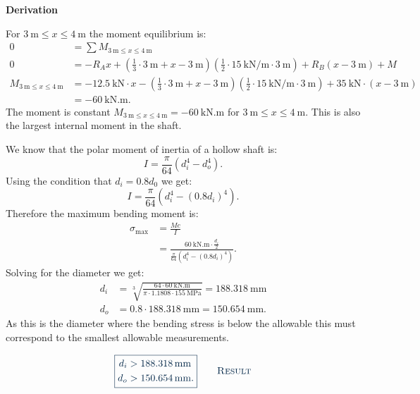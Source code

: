 \documentclass[a4paper]{article}
\numberwithin{equation}{problem}
\newcommand{\AUheading}[1]{%
  \par\vspace{.4\baselineskip}%
  {\sffamily\bfseries\color{AUblueDark}#1\par}%
  \nobreak%
}
\newenvironment{derivation}[1][Derivation]{%
  \AUheading{#1}
  \begingroup\allowdisplaybreaks
  \setlength{\abovedisplayskip}{6pt}%
  \setlength{\belowdisplayskip}{6pt}%
  \setlength{\abovedisplayshortskip}{4pt}%
  \setlength{\belowdisplayshortskip}{4pt}%
}{\par\endgroup\medskip}
\newcommand{\finalresult}[1]{%
  \vspace{.2\baselineskip}%
  \begin{equation}
    {\color{AUblueDark}\boxed{\displaystyle #1}}
    \tag*{\textsc{\textcolor{AUblueDark}{Result}}}
  \end{equation}
  \newpage
}
\begin{document}
\begin{derivation}
  For $\qty{3}{\m}  \leq x \leq \qty{4}{\m} $ the moment equilibrium is:
  \begin{align*}
    0 &= \sum M_{\qty{3}{\m} \leq x \leq \qty{4}{\m} } \\
    0 &= - R_A x + \left( \frac{1}{3} \cdot \qty{3}{\m} + x - \qty{3}{\m}  \right) \left( \frac{1}{2} \cdot \qty{15}{\kN\per\m} \cdot \qty{3}{\m}  \right) + R_B \left( x - \qty{3}{\m}  \right) + M \\
      M_{\qty{3}{\m} \leq x \leq \qty{4}{\m}} &= \qty{-12,5}{\kN} \cdot x - \left( \frac{1}{3} \cdot \qty{3}{\m} + x - \qty{3}{\m}  \right) \left( \frac{1}{2} \cdot \qty{15}{\kN\per\m} \cdot \qty{3}{\m}  \right) + \qty{35}{\kN} \cdot \left( x - \qty{3}{\m}  \right) \\
                                              &= \qty{-60}{\kN.\m} 
  .\end{align*}
  The moment is constant $M_{\qty{3}{\m} \leq x \leq \qty{4}{\m}} = \qty{-60}{\kN.\m}$ for $\qty{3}{\m} \leq x \leq \qty{4}{\m}$.
  This is also the largest internal moment in the shaft.

  We know that the polar moment of inertia of a hollow shaft is:
  \[ 
  I = \frac{\pi}{64} \left( d_i^{4} - d_o^{4} \right)
  .\]
  Using the condition that $d_i = \num{0,8}  d_0$ we get:
  \[ 
  I = \frac{\pi}{64} \left( d_i^{4} - \left( \num{0,8} d_i \right)^{4} \right)
  .\]
  Therefore the maximum bending moment is:
  \begin{align*}
    \sigma_{\mathrm{max}} &= \frac{Mc}{I} \\
                          &= \frac{\qty{60}{\kN.\m} \cdot \frac{d_i}{2}}{\frac{\pi}{64} \left( d_i^{4} - \left( \num{0,8} d_i \right)^{4} \right)}
  .\end{align*}
  Solving for the diameter we get:
  \begin{align*}
    d_i &= \sqrt[3]{\frac{64 \cdot \qty{60}{\kN.\m} }{\pi \cdot \num{1,1808} \cdot \qty{155}{\MPa} }} = \qty{188,318}{\mm} \\
    d_o &= \num{0,8}  \cdot \qty{188,318}{\mm} = \qty{150,654}{\mm} 
  .\end{align*}
  As this is the diameter where the bending stress is below the allowable this must correspond to the smallest allowable measurements.
\end{derivation}

\finalresult{
\begin{aligned}
  d_i &> \qty{188,318}{\mm}  \\
  d_o &> \qty{150,654}{\mm} 
.\end{aligned}
}
\end{document}
